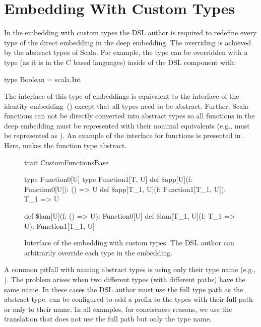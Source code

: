 \section{Embedding With Custom Types}
\label{sec:embedding-with-custom-types}

In the embedding with custom types the DSL author is required to redefine every
type of the direct embedding in the deep embedding. The overriding is achieved by
the abstract types of Scala. For example, the type  can be overridden
with a type  (as it is in the C based languages) inside of the DSL component with:\begin{lstparagraph}
type Boolean = scala.Int
\end{lstparagraph}

The interface of this type of embeddings is equivalent to the interface of the identity embedding~() except that all types need to be abstract. Further, Scala functions can not be directly
converted into abstract types so all functions in the deep embedding must be represented
with their nominal equivalents (e.g.,  must be represented as ).
An example of the interface for functions is presented in . Here,  makes
the function type abstract.

\begin{figure}
\begin{listingtiny}
trait CustomFunctionsBase {
  type Function0[U]
  type Function1[T, U]
  def $\$$app[U](f: Function0[U]): () => U
  def $\$$app[T_1, U](f: Function1[T_1, U]): T_1 => U

  def $\$$lam[U](f: () => U): Function0[U]
  def $\$$lam[T_1, U](f: T_1 => U): Function1[T_1, U]
}
\end{listingtiny}
\caption{Interface of the embedding with custom types. The DSL author can arbitrarily override each type in the embedding.}
\label{fig:custom-types}
\end{figure}

A common pitfall with naming abstract types is using only their type name (e.g., ).
 The problem arises when two different types (with different paths) have the same name. In these cases
 the DSL author must use the full type path as the abstract type. \yy can be configured to
 add a prefix to the types with their full path or only to their name. In all examples, for conciseness reasons,
 we use the translation that does not use the full path but only the type name.

